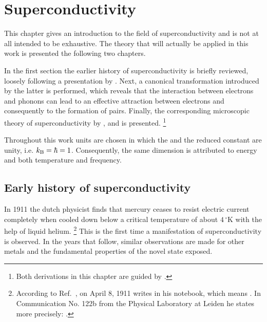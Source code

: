 
\chapter{Superconductivity}
\label{superconductivity}

This chapter gives an introduction to the field of superconductivity and is not
at all intended to be exhaustive. The theory that will actually be applied in
this work is presented the following two chapters.

In the first section the earlier history of superconductivity is briefly
reviewed, loosely following a presentation by 
\cite{Froehlich82}. Next, a canonical transformation introduced by the latter is
performed, which reveals that the interaction between electrons and phonons can
lead to an effective attraction between electrons and consequently to the
formation of  pairs. Finally, the corresponding microscopic theory
of superconductivity by ,  and  is
presented.%
%
\footnote{Both derivations in this chapter are guided by 
\cite{Czycholl08}.}

Throughout this work units are chosen in which the  and the
reduced  constant are unity, i.e. $k \sb{\text{B}} = \hbar = 1$.
Consequently, the same dimension is attributed to energy and both temperature
and frequency.

\section{Early history of superconductivity}

In 1911 the dutch physicist  finds that mercury ceases to
resist electric current completely when cooled down below a critical temperature
of about $4\,^\circ \mathrm K$ with the help of liquid helium.%
%
\footnote{According to Ref.~, on April 8, 1911
 writes  in his notebook, which
means . In Communication No. 122b
from the Physical Laboratory at Leiden he states more precisely: 
\cite{KamerlinghOnnes11}.}
%
This is the first time a manifestation of superconductivity is observed. In the
years that follow, similar observations are made for other metals and the
fundamental properties of the novel state exposed.

